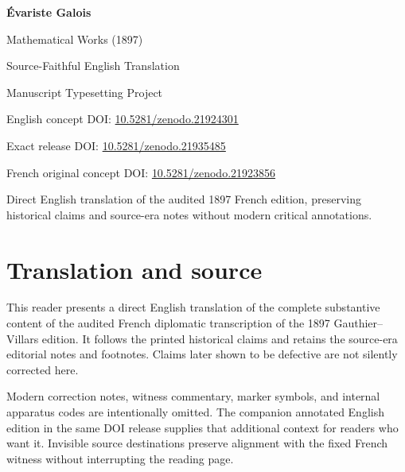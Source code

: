 \documentclass[11pt,oneside,openany]{book}
\begin{document}
\begin{titlepage}
\centering
\vspace*{0.11\textheight}
{\Huge\bfseries Évariste Galois\par}
\vspace{1.5em}
{\LARGE Mathematical Works (1897)\par}
\vspace{0.7em}
  {\Large Source-Faithful English Translation\par}
\vfill
{\large Manuscript Typesetting Project\par}
\vspace{1em}
{\small English concept DOI: \href{https://doi.org/10.5281/zenodo.21924301}{10.5281/zenodo.21924301}\par}
{\small Exact release DOI: \href{https://doi.org/10.5281/zenodo.21935485}{10.5281/zenodo.21935485}\par}
{\small French original concept DOI: \href{https://doi.org/10.5281/zenodo.21923856}{10.5281/zenodo.21923856}\par}
\vspace{2em}
  {\footnotesize Direct English translation of the audited 1897 French edition, preserving historical claims and source-era notes without modern critical annotations.\par}
\end{titlepage}
\clearpage
\frontmatter
\chapter*{Translation and source}
This reader presents a direct English translation of the complete substantive content of the audited French diplomatic transcription of the 1897 Gauthier--Villars edition. It follows the printed historical claims and retains the source-era editorial notes and footnotes. Claims later shown to be defective are not silently corrected here.

Modern correction notes, witness commentary, marker symbols, and internal apparatus codes are intentionally omitted. The companion annotated English edition in the same DOI release supplies that additional context for readers who want it. Invisible source destinations preserve alignment with the fixed French witness without interrupting the reading page.
\end{document}
